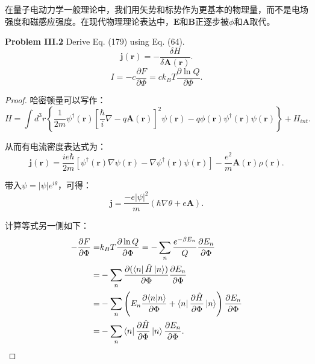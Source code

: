 \documentclass[reqno,a4paper,12pt]{amsart}
\begin{document}
在量子电动力学一般理论中，我们用矢势和标势作为更基本的物理量，而不是电场强度和磁感应强度。在现代物理理论表达中，$\mathbf{E}$和$\mathbf{B}$正逐步被$\phi$和$\mathbf{A}$取代。



\textbf{Problem III.2} Derive Eq. (179) using Eq. (64).
\[
	\mathbf{j}(\mathbf{r}) = -\frac{\delta H}{\delta \mathbf{A}(\mathbf{r})}. \tag{64a}
\]
\[
	I = -c\frac{\partial F}{\partial \Phi} = ck_BT\frac{\partial \ln Q}{\partial \Phi}. \tag{179}
\]

\begin{proof}

哈密顿量可以写作：
\[
	H = \int d^3 r \left\{ \frac{1}{2m}\psi^\dagger(\mathbf{r}) \left[ \frac{\hbar}{i}\nabla - q\mathbf{A}(\mathbf{r}) \right]^2 \psi(\mathbf{r}) - q\phi(\mathbf{r}) \psi^\dagger(\mathbf{r}) \psi(\mathbf{r}) \right\} + H_{int}.
\]

从而有电流密度表达式为：
\[
	\mathbf{j}(\mathbf{r}) = \frac{ie\hbar}{2m}[\psi^\dagger(\mathbf{r}) \nabla \psi(\mathbf{r}) - \nabla \psi^\dagger(\mathbf{r}) \psi(\mathbf{r})] - \frac{e^2}{m} \mathbf{A}(\mathbf{r}) \rho(\mathbf{r}).
\]

带入$\psi = \vert \psi \vert e^{i\theta}$，可得：
\[
	\mathbf{j} = \frac{-e\vert \psi \vert^2}{m}(\hbar \nabla \theta + e \mathbf{A}).
\]

计算等式另一侧如下：
\begin{align*}
	-\frac{\partial F}{\partial \Phi} =& k_BT \frac{\partial \ln Q}{\partial \Phi} = -\sum_n \frac{e^{-\beta E_n}}{Q} \frac{\partial E_n}{\partial \Phi} \\
	=& -\sum_n \frac{\partial (\bra{n} \hat{H} \ket{n})}{\partial \Phi} \frac{\partial E_n}{\partial \Phi} \\
	=& -\sum_{n} \left( E_n \frac{\partial \langle n \vert n \rangle}{\partial \Phi} + \bra{n} \frac{\partial \hat{H}}{\partial \Phi} \ket{n} \right) \frac{\partial E_n}{\partial \Phi} \\
	=& -\sum_n \bra{n} \frac{\partial \hat{H}}{\partial \Phi} \ket{n} \frac{\partial E_n}{\partial \Phi}.
\end{align*}


\end{proof}
\end{document}
